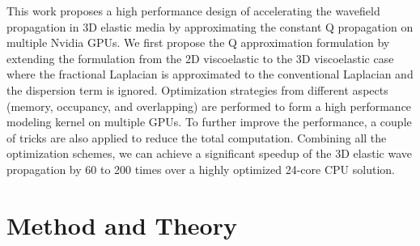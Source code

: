 \documentclass{paris17}
\begin{document}
This work proposes a high performance design of accelerating the wavefield propagation in 3D elastic media by approximating the constant Q propagation on multiple Nvidia GPUs. We first propose the Q approximation formulation by extending the formulation from the 2D viscoelastic to the 3D viscoelastic case where the fractional Laplacian is approximated to the conventional Laplacian and the dispersion term is ignored.  Optimization strategies from different aspects (memory, occupancy, and overlapping) are performed to form a high performance modeling kernel on multiple GPUs. To further improve the performance, a couple of tricks are also applied to reduce the total computation. Combining all the optimization schemes, we can achieve a significant speedup of the 3D elastic wave propagation by 60 to 200 times over a highly optimized 24-core CPU solution.

\section{Method and Theory}





\end{document}
